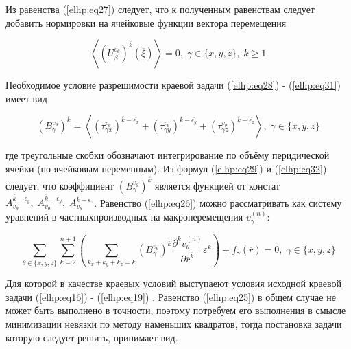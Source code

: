 Из равенства 
(\ref{elhp:eq27})
следует, что к полученным равенствам следует добавить нормировки на 
ячейковые функции вектора перемещения

\begin{equation}
    \label{elhp:eq31}
    \left< \left( U_{\beta}^{v_{\theta}} \right)^{ \overline{k} } \left( \overline{\xi}  \right)   \right> = 0
    ,\;
    \gamma \in \{x,y,z\} ,\; k \ge 1
\end{equation}


Необходимое условие разрешимости краевой задачи 
(\ref{elhp:eq28})
-
(\ref{elhp:eq31})
имеет вид

\begin{equation}
    \label{elhp:eq32}
    \left( B_{\gamma}^{v_{\theta}} \right)^{ \overline{k} } =
    \left< 
    \left( \tau_{ \gamma x}^{v_{\theta}} \right)^{ \overline{k} - \overline{\epsilon_x} } +
    \left( \tau_{ \gamma y}^{v_{\theta}} \right)^{ \overline{k} - \overline{\epsilon_y} } +
    \left( \tau_{ \gamma z}^{v_{\theta}} \right)^{ \overline{k} - \overline{\epsilon_z} } 
    \right> 
    ,\;
    \gamma \in \{x,y,z\} 
\end{equation}

где треугольные скобки обозначают интегрирование по объёму перидической ячейки (по ячейковым переменным). Из формул 
(\ref{elhp:eq29})
и 
(\ref{elhp:eq32})
следует, что коэффициент 
$\left( B_{\gamma}^{v_{\theta}} \right)^{ \overline{k} }$ 
является функцией от констат 
$A_{v_{\theta}}^{ \overline{k} - \epsilon_y} ,\;A_{v_{\theta}}^{ \overline{k} - \epsilon_y} ,\;A_{v_{\theta}}^{ \overline{k} - \epsilon_z}$. 
Равенство 
(\ref{elhp:eq26})
можно рассматривать как систему уравнений в частныхпроизводных на 
макроперемещения 
$v_{\gamma}^{(n)}$:

\begin{equation}
    \label{elhp:eq33}
    \sum_{ \theta \in \{x,y,z\} } \sum_{k=2}^{n+1}
    \left( 
        \sum_{k_x+k_y+k_z = k}
        \left( B_{\gamma}^{v_{\theta}} \right)^{ \overline{k} }
        \frac{\partial^k v_{\theta}^{(n)}}{\partial \overline{r}^{ \overline{k}}}
        \varepsilon^k
    \right) 
    + f_{ \gamma} \left( \overline{r}  \right) = 0
    ,\;
    \gamma \in \{x,y,z\} 
\end{equation}

Для которой в качестве краевых условий выступаеют условия исходной краевой задачи 
(\ref{elhp:eq16})
-
(\ref{elhp:eq19})
. Равенство 
(\ref{elhp:eq25})
в общем случае не может быть выполнено 
в точности, поэтому потребуем его выполнения в смысле минимизации невязки по методу наменьших квадратов, тогда постановка задачи которую следует
решить, принимает вид.

